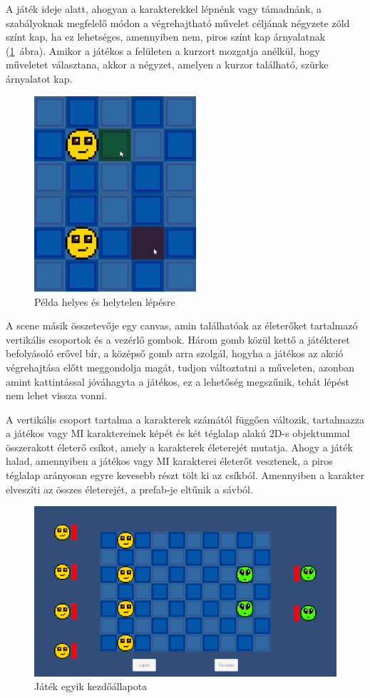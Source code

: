 \documentclass[
]{thesis-ekf}
\theoremstyle{definition}
\theoremstyle{remark}
\begin{document}
A játék ideje alatt, ahogyan a karakterekkel lépnénk vagy támadnánk, a szabályoknak megfelelő módon a végrehajtható művelet céljának négyzete zöld színt kap, ha ez lehetséges, amennyiben nem, piros színt kap árnyalatnak (\ref{gamemove}~ábra). Amikor a játékos a felületen a kurzort mozgatja anélkül, hogy műveletet választana, akkor a négyzet, amelyen a kurzor található, szürke árnyalatot kap.

\begin{figure}[h!]
	\centering
	\includegraphics[width=6cm]{./pictures/game_move_tile.png}
	\caption{Példa helyes és helytelen lépésre}
	\label{gamemove}
\end{figure}

A scene másik összetevője egy canvas, amin találhatóak az életerőket tartalmazó vertikális csoportok és a vezérlő gombok. Három gomb közül kettő a játékteret befolyásoló erővel bír, a középső gomb arra szolgál, hogyha a játékos az akció végrehajtása előtt meggondolja magát, tudjon változtatni a műveleten, azonban amint kattintással jóváhagyta a játékos, ez a lehetőség megszűnik, tehát lépést nem lehet vissza vonni.

A vertikális csoport tartalma a karakterek számától függően változik, tartalmazza a játékos vagy MI karaktereinek képét és két téglalap alakú 2D-s objektummal összerakott életerő csíkot, amely a karakterek életerejét mutatja. Ahogy a játék halad, amennyiben a játékos vagy MI karakterei életerőt vesztenek, a piros téglalap arányosan egyre kevesebb részt tölt ki az csíkból. Amennyiben a karakter elveszíti az összes életerejét, a prefab-je eltűnik a sávból.

\begin{figure}[h!]
	\centering
	\includegraphics[width=14cm]{./pictures/game_health_ui.png}
	\caption{Játék egyik kezdőállapota}
	\label{game}
\end{figure}
\end{document}
